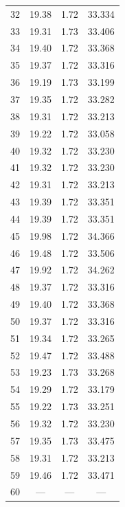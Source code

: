 \begin{table}[htbp]
\begin{tabular}{c S[table-format=2.2] S[table-format=1.2] S[table-format=2.3]}
32 & 19.38 & 1.72 & 33.334 \\
33 & 19.31 & 1.73 & 33.406 \\
34 & 19.40 & 1.72 & 33.368 \\
35 & 19.37 & 1.72 & 33.316 \\
36 & 19.19 & 1.73 & 33.199 \\
37 & 19.35 & 1.72 & 33.282 \\
38 & 19.31 & 1.72 & 33.213 \\
39 & 19.22 & 1.72 & 33.058 \\
40 & 19.32 & 1.72 & 33.230 \\
41 & 19.32 & 1.72 & 33.230 \\
42 & 19.31 & 1.72 & 33.213 \\
43 & 19.39 & 1.72 & 33.351 \\
44 & 19.39 & 1.72 & 33.351 \\
45 & 19.98 & 1.72 & 34.366 \\
46 & 19.48 & 1.72 & 33.506 \\
47 & 19.92 & 1.72 & 34.262 \\
48 & 19.37 & 1.72 & 33.316 \\
49 & 19.40 & 1.72 & 33.368 \\
50 & 19.37 & 1.72 & 33.316 \\
51 & 19.34 & 1.72 & 33.265 \\
52 & 19.47 & 1.72 & 33.488 \\
53 & 19.23 & 1.73 & 33.268 \\
54 & 19.29 & 1.72 & 33.179 \\
55 & 19.22 & 1.73 & 33.251 \\
56 & 19.32 & 1.72 & 33.230 \\
57 & 19.35 & 1.73 & 33.475 \\
58 & 19.31 & 1.72 & 33.213 \\
59 & 19.46 & 1.72 & 33.471 \\
60 & {---}  & {---} & {---}   \\
\bottomrule
\end{tabular}
\end{table}
